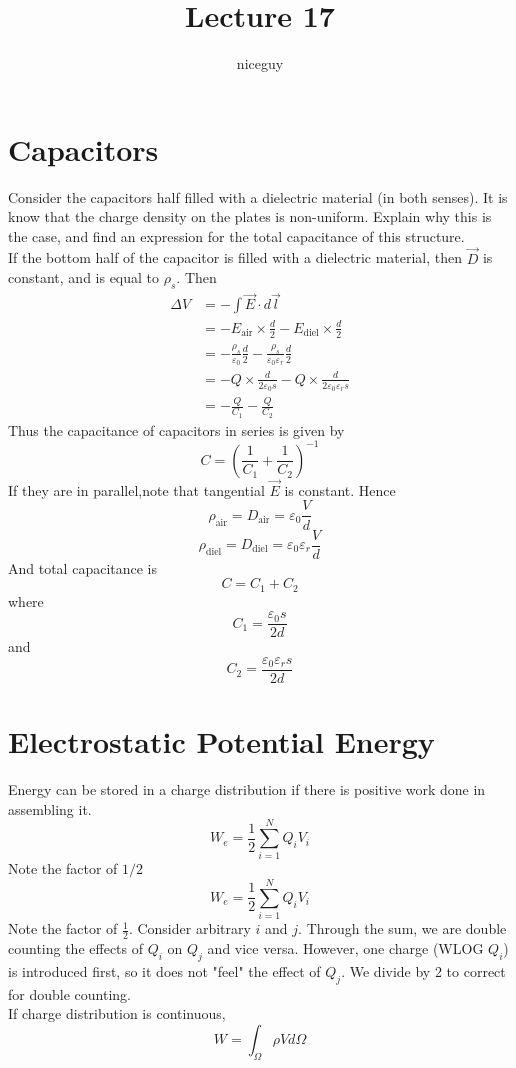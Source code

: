 \documentclass[12pt]{article}
\author{niceguy}
\title{Lecture 17}
\begin{document}
\maketitle

\section{Capacitors}

\begin{ex}
	Consider the capacitors half filled with a dielectric material (in both senses). It is know that the charge density on the plates is non-uniform. Explain why this is the case, and find an expression for the total capacitance of this structure. \\
	If the bottom half of the capacitor is filled with a dielectric material, then $\vec{D}$ is constant, and is equal to $\rho_s$. Then
	\begin{align*}
		\Delta V &= -\int \vec{E}\cdot d\vec{l} \\
			 &= -E_{\text{air}}\times\frac{d}{2} - E_{\text{diel}}\times\frac{d}{2} \\
			 &= -\frac{\rho_s}{\varepsilon_0}\frac{d}{2} - \frac{\rho_s}{\varepsilon_0\varepsilon_r}\frac{d}{2} \\
			 &= -Q\times\frac{d}{2\varepsilon_0s} - Q\times\frac{d}{2\varepsilon_0\varepsilon_rs} \\
			 &= -\frac{Q}{C_1} - \frac{Q}{C_2}
	\end{align*}
	Thus the capacitance of capacitors in series is given by
	$$C = \left(\frac{1}{C_1}+\frac{1}{C_2}\right)^{-1}$$
	If they are in parallel,note that tangential $\vec{E}$ is constant. Hence
	$$\rho_{\text{air}} = D_{\text{air}} = \varepsilon_0\frac{V}{d}$$
	$$\rho_{\text{diel}} = D_{\text{diel}} = \varepsilon_0\varepsilon_r\frac{V}{d}$$
	And total capacitance is
	$$C = C_1 + C_2$$
	where
	$$C_1 = \frac{\varepsilon_0s}{2d}$$
	and
	$$C_2 = \frac{\varepsilon_0\varepsilon_rs}{2d}$$
\end{ex}

\section{Electrostatic Potential Energy}

Energy can be stored in a charge distribution if there is positive work done in assembling it.
$$W_e = \frac{1}{2}\sum_{i=1}^NQ_iV_i$$
Note the factor of $1/2$
$$W_e = \frac{1}{2}\sum_{i=1}^NQ_iV_i$$
Note the factor of $\frac{1}{2}$. Consider arbitrary $i$ and $j$. Through the sum, we are double counting the effects of $Q_i$ on $Q_j$ and vice versa. However, one charge (WLOG $Q_i$) is introduced first, so it does not "feel" the effect of $Q_j$. We divide by 2 to correct for double counting. \\
If charge distribution is continuous,
$$W = \int_\Omega \rho Vd\Omega$$
\end{document}
